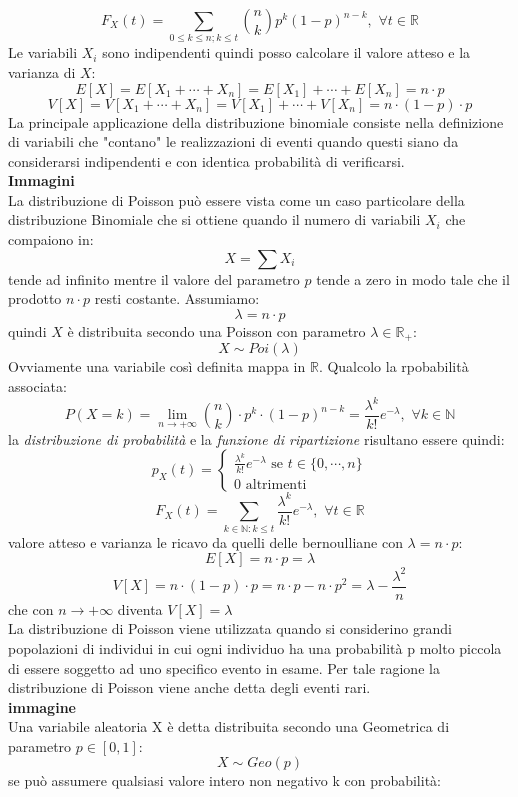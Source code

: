 \documentclass[a4paper,12pt, oneside]{book}
\newcommand{\numberset}{\mathbb}
\newcommand{\R}{\numberset{R}}
\begin{document}
\[F_X(t)=\sum_{0\leq k\leq n;k\leq t}\binom{n}{k}p^k(1-p)^{n-k},\,\,\forall t\in \R\]
Le variabili $X_i$ sono indipendenti quindi posso calcolare il valore atteso e la varianza di $X$:
\[E[X]=E[X_1+\cdots+X_n]=E[X_1]+\cdots+E[X_n]=n\cdot p\]
\[V[X]=V[X_1+\cdots+X_n]=V[X_1]+\cdots+V[X_n]=n\cdot (1-p)\cdot p\]
La principale applicazione della distribuzione binomiale consiste nella definizione di variabili che "contano" le realizzazioni di eventi quando questi siano da considerarsi indipendenti e con identica probabilità di verificarsi.\\
\textbf{Immagini}\\
La distribuzione di Poisson può essere vista come un caso particolare della
distribuzione Binomiale che si ottiene quando il numero di variabili $X_i$ che compaiono in:
\[X=\sum X_i\]
tende ad infinito mentre il valore del parametro $p$ tende a zero in modo tale che il prodotto $n\cdot p$ resti costante. Assumiamo:
\[\lambda = n\cdot p\]
quindi $X$ è distribuita secondo una Poisson con parametro $\lambda\in\R_+$:
\[X\sim Poi(\lambda)\]
Ovviamente una variabile così definita mappa in $\R$. Qualcolo la rpobabilità associata:
\[P(X=k)=\lim_{n\to+\infty} \binom{n}{k}\cdot p^k\cdot (1-p)^{n-k}=\frac{\lambda^k}{k!}e^{-\lambda},\,\,\forall k\in\mathbb{N}\]
la \textit{distribuzione di probabilità} e la \textit{funzione di ripartizione} risultano essere quindi:
\[p_X(t)=\begin{cases}
\frac{\lambda^k}{k!}e^{-\lambda} \mbox{ se } t\in\{0,\cdots, n\}\\
0 \mbox{ altrimenti}
\end{cases}\]
\[F_X(t)=\sum_{k\in\mathbb{N}:k\leq t}\frac{\lambda^k}{k!}e^{-\lambda},\,\,\forall t\in\R \]
valore atteso e varianza le ricavo da quelli delle bernoulliane con $\lambda=n\cdot p$:
\[E[X]=n\cdot p=\lambda\]
\[V[X]=n\cdot (1-p)\cdot p=n\cdot p-n\cdot p^2= \lambda-\frac{\lambda^2}{n}\]
che con $n\to +\infty$ diventa $V [X]=\lambda$\\
La distribuzione di Poisson viene utilizzata quando si considerino grandi popolazioni di individui in cui ogni individuo ha una probabilità p molto piccola di essere soggetto ad uno specifico evento in esame. Per tale ragione la distribuzione di Poisson viene anche detta degli eventi rari.\\
\textbf{immagine}
\\
Una variabile aleatoria X è detta distribuita secondo una Geometrica di parametro $p\in[0,1]$:
\[X\sim Geo(p)\]
se può assumere qualsiasi valore intero non negativo k con probabilità:
\end{document}
